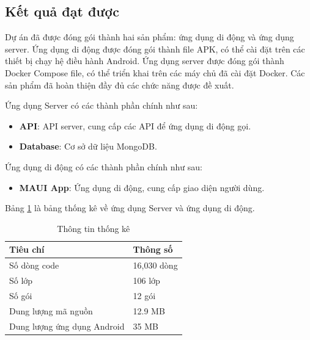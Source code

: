 \documentclass[../DoAn.tex]{subfiles}
\begin{document}
\subsection{Kết quả đạt được}

Dự án đã được đóng gói thành hai sản phẩm: ứng dụng di động và ứng dụng server. Ứng dụng di động được đóng gói thành file APK, có thể cài đặt trên các thiết bị chạy hệ điều hành Android. Ứng dụng server được đóng gói thành Docker Compose file, có thể triển khai trên các máy chủ đã cài đặt Docker. Các sản phẩm đã hoàn thiện đầy đủ các chức năng được đề xuất.

Ứng dụng Server có các thành phần chính như sau:
\begin{itemize}
    \item \textbf{API}: API server, cung cấp các API để ứng dụng di động gọi.
    \item \textbf{Database}: Cơ sở dữ liệu MongoDB.
\end{itemize}

Ứng dụng di động có các thành phần chính như sau:
\begin{itemize}
    \item \textbf{MAUI App}: Ứng dụng di động, cung cấp giao diện người dùng.
\end{itemize}

Bảng \ref{table:implementation-statistics} là bảng thống kê về ứng dụng Server và ứng dụng di động.
\begin{table}[H]
    \begin{tabularx}{\textwidth}{|l|X|}
        \hline
        \textbf{Tiêu chí}           & \textbf{Thông số} \\ \hline
        Số dòng code                & 16,030 dòng       \\ \hline
        Số lớp                      & 106 lớp           \\ \hline
        Số gói                      & 12 gói            \\ \hline
        Dung lượng mã nguồn         & 12.9 MB           \\ \hline
        Dung lượng ứng dụng Android & 35 MB             \\ \hline
    \end{tabularx}
    \caption{Thông tin thống kê}
    \label{table:implementation-statistics}
\end{table}
\break
\end{document}
